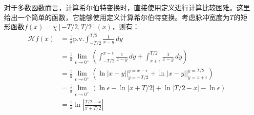 \begin{example}[直接计算希尔伯特变换]
    对于多数函数而言，计算希尔伯特变换时，直接使用定义进行计算比较困难。这里给出一个简单的函数，它能够使用定义计算希尔伯特变换。考虑脉冲宽度为$T$的矩形函数$f(x)=\chi[-T/2,T/2](x)$，则有：
    \begin{align*}
        \mathcal{H} f(x)&=\frac{1}{\pi}\text{p.v.}\int_{-T/2}^{T/2}\frac{1}{x-y}\,dy\\
        &=\frac{1}{\pi}\lim_{\epsilon\to 0^+}\left(\int_{-T/2}^{x-\epsilon}\frac{1}{x-y}\,dy+\int_{x+\epsilon}^{T/2}\frac{1}{x-y}\,dy\right)\\
        &=\frac{1}{\pi}\lim_{\epsilon\to 0^+}\left(\ln|x-y|\Big|_{y=-T/2}^{y=x-\epsilon}+\ln|x-y|\Big|_{y=x+\epsilon}^{y=T/2}\right)\\
        &=\frac{1}{\pi}\lim_{\epsilon\to 0^+}\left(\ln \epsilon -\ln|x+T/2|+\ln|T/2 -x|-\ln \epsilon \right)\\
        &=\frac{1}{\pi}\ln\left|\frac{T/2 -x}{x+T/2}\right|
    \end{align*}
\end{example}

